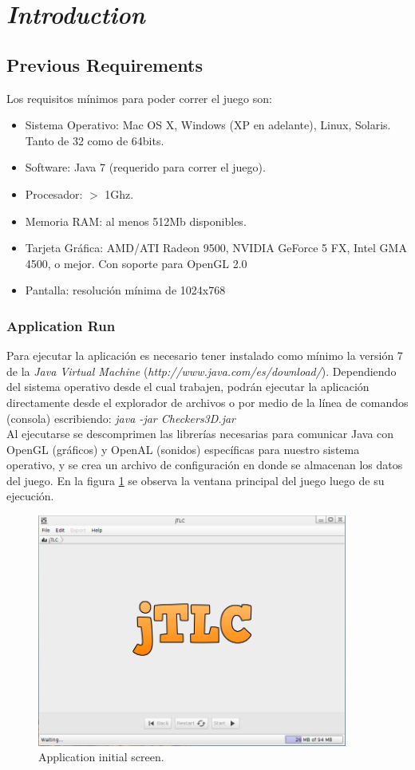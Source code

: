 \chapter*{\textit{Introduction}}
\section*{Previous Requirements}
Los requisitos m\'inimos para poder correr el juego son:
\begin{itemize} \itemsep0pt \parskip0pt 
	\renewcommand{\labelitemi}{$\rightarrow$}
	\item Sistema Operativo: Mac OS X, Windows (XP en adelante), Linux, Solaris. Tanto de 32 como de 64bits.
	\item Software: Java 7 (requerido para correr el juego).
	\item Procesador: {$>$} 1Ghz.
	\item Memoria RAM: al menos 512Mb disponibles.
	\item Tarjeta Gráfica: AMD/ATI Radeon 9500, NVIDIA GeForce 5 FX, Intel GMA 4500, o mejor. Con soporte para OpenGL 2.0
	\item Pantalla: resoluci\'on m\'inima de 1024x768
\end{itemize}

\subsection*{Application Run}
Para ejecutar la aplicaci\'on es necesario tener instalado como m\'inimo la versi\'on 7 de la \textit{Java Virtual Machine} (\emph{http://www.java.com/es/download/}). Dependiendo del sistema operativo desde el cual trabajen, podr\'an ejecutar la aplicaci\'on directamente desde el explorador de archivos o por medio de la l\'inea de comandos (consola) escribiendo: 
\emph{java -jar Checkers3D.jar}\\
Al ejecutarse se descomprimen las librer\'ias necesarias para comunicar Java con OpenGL (gr\'aficos) y OpenAL (sonidos) espec\'ificas para nuestro sistema operativo, y se crea un archivo de configuraci\'on en donde se almacenan los datos del juego.
En la figura \ref{fig:inicial} se observa la ventana principal del juego luego de su ejecuci\'on. 

\begin{figure}[H]
	\vspace{-1cm}
	\centering
	\includegraphics[width=385px]{imagenes/main}
	\centering
	\vspace{-0.4cm}
	\caption{Application initial screen.}
	\label{fig:inicial}
	\vspace{-0.25cm}
\end{figure}